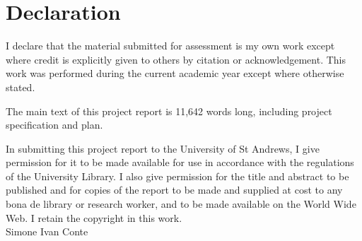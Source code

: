 \section{Declaration}
I declare that the material submitted for assessment is my own work except where credit is explicitly
given to others by citation or acknowledgement. This work was performed during the current academic
year except where otherwise stated.

The main text of this project report is 11,642 words long, including project specification and plan.

In submitting this project report to the University of St Andrews, I give permission for it to be made
available for use in accordance with the regulations of the University Library. I also give permission for
the title and abstract to be published and for copies of the report to be made and supplied at cost to
any bona de library or research worker, and to be made available on the World Wide Web. I retain the
copyright in this work.
\\[2in]
Simone Ivan Conte
\newpage